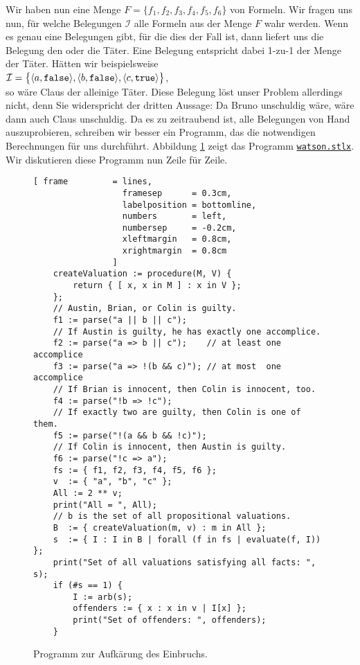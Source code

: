 Wir haben nun eine Menge $F = \{ f_1, f_2, f_3, f_4, f_5, f_6 \}$ von Formeln.
Wir fragen uns nun, f\"{u}r welche Belegungen $\mathcal{I}$ alle Formeln aus der Menge $F$ wahr werden.
Wenn es genau eine Belegungen gibt, f\"{u}r die dies der Fall ist, dann liefert uns die
Belegung den oder die T\"{a}ter.  Eine Belegung entspricht dabei 1-zu-1 der Menge der T\"{a}ter.
H\"{a}tten wir beispielsweise \\[0.2cm]
\hspace*{1.3cm} 
$\mathcal{I} = \bigl\{ \pair(a,\texttt{false}), \pair(b,\texttt{false}), \pair(c,\texttt{true}) \bigr\}$,
\\[0.2cm]
so w\"{a}re Claus der alleinige T\"{a}ter.  Diese Belegung l\"{o}st unser Problem allerdings
nicht, denn Sie widerspricht der dritten Aussage: Da Bruno unschuldig w\"{a}re, w\"{a}re dann auch
Claus unschuldig.  Da es zu zeitraubend ist, alle Belegungen von Hand auszuprobieren,
schreiben wir besser ein Programm, das die notwendigen Berechnungen f\"{u}r uns durchf\"{u}hrt.
Abbildung \ref{fig:watson.stlx} zeigt das Programm
\href{https://github.com/karlstroetmann/Logik/blob/master/SetlX/watson.stlx}{\texttt{watson.stlx}}.
Wir diskutieren diese Programm nun Zeile f\"{u}r Zeile.

\begin{figure}[!ht]
  \centering
\begin{Verbatim}[ frame         = lines, 
                  framesep      = 0.3cm, 
                  labelposition = bottomline,
                  numbers       = left,
                  numbersep     = -0.2cm,
                  xleftmargin   = 0.8cm,
                  xrightmargin  = 0.8cm
                ]
    createValuation := procedure(M, V) {
        return { [ x, x in M ] : x in V };
    };
    // Austin, Brian, or Colin is guilty.
    f1 := parse("a || b || c");
    // If Austin is guilty, he has exactly one accomplice.
    f2 := parse("a => b || c");    // at least one accomplice
    f3 := parse("a => !(b && c)"); // at most  one accomplice
    // If Brian is innocent, then Colin is innocent, too.
    f4 := parse("!b => !c"); 
    // If exactly two are guilty, then Colin is one of them.
    f5 := parse("!(a && b && !c)"); 
    // If Colin is innocent, then Austin is guilty.
    f6 := parse("!c => a");
    fs := { f1, f2, f3, f4, f5, f6 };
    v  := { "a", "b", "c" };
    All := 2 ** v;
    print("All = ", All);
    // b is the set of all propositional valuations.
    B  := { createValuation(m, v) : m in All };
    s  := { I : I in B | forall (f in fs | evaluate(f, I)) };
    print("Set of all valuations satisfying all facts: ", s);
    if (#s == 1) {
        I := arb(s);
        offenders := { x : x in v | I[x] };
        print("Set of offenders: ", offenders);
    }
\end{Verbatim}
\vspace*{-0.3cm}
  \caption{Programm zur Aufk\"{a}rung des Einbruchs.}
  \label{fig:watson.stlx}
\end{figure}

